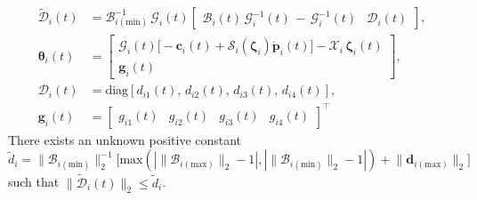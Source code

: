 \documentclass[lettersize,journal]{IEEEtran}
\begin{document}
\begin{align*}
    \tilde{\mathcal{D}}_i(t) &= \mathcal{B}_{i (\text{min})}^{-1} \,\mathcal{G}_i(t) \begin{bmatrix}  \mathcal{B}_i(t)  \, \mathcal{G}_i^{-1}(t) \,-\, \mathcal{G}_i^{-1}(t) & \mathcal{D}_i(t) \end{bmatrix}, \\
    \boldsymbol{\theta}_i(t) &= \begin{bmatrix}
    \mathcal{G}_i(t) \big[- \boldsymbol{c}_i(t) + \mathcal{S}_i(\boldsymbol{\zeta}_i) \dot{\boldsymbol{p}}_i(t) \big] - \mathcal{X}_i\,\boldsymbol{\zeta}_i(t) \\ \boldsymbol{g}_i(t)
    \end{bmatrix}, \\
    \mathcal{D}_i(t) &= \text{diag}[d_{i 1}(t), \, d_{i 2}(t), \, d_{i 3}(t), \, d_{i 4}(t)], \\
    \boldsymbol{g}_i(t) &= \begin{bmatrix} g_{i 1}(t) & g_{i 2}(t) & g_{i 3}(t) & g_{i 4}(t) \end{bmatrix}^{\top}
\end{align*}
There exists an unknown positive constant $\tilde{d}_i = \lVert \mathcal{B}_{i (\text{min})} \rVert_2^{-1} \Big[\text{max}\left(|\lVert \mathcal{B}_{i (\text{max})} \rVert_2 - 1|,|\lVert \mathcal{B}_{i (\text{min})} \rVert_2 - 1|\right) + \lVert \boldsymbol{d}_{i(\text{max})} \rVert_2 \Big]$ such that $\lVert\tilde{\mathcal{D}}_i(t)\rVert_2\leq\tilde{d}_i$.
 
\end{document}
